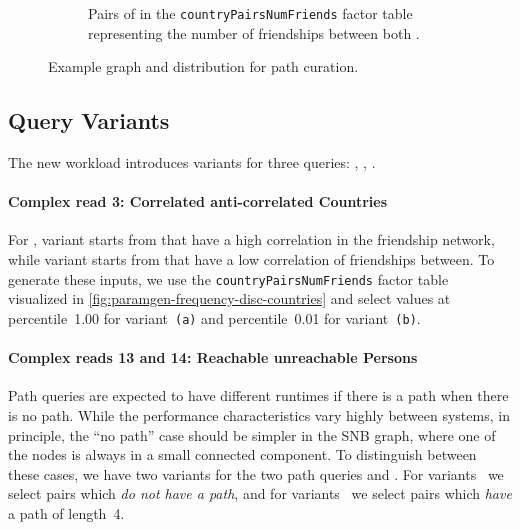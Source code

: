 \begin{figure}[htb]
\begin{subfigure}{0.58\textwidth}
        \vspace{-3ex}
        \caption{
            Pairs of \Countries in the \texttt{countryPairsNum\-Friends} factor table representing the number of friendships between both \Countries.
        }
        \label{fig:paramgen-frequency-disc-countries}
    \end{subfigure}
    \caption{Example graph and distribution for path curation.}
    \label{y}
    \vspace{-4.5ex}
\end{figure}

\subsection{Query Variants}
\label{sec:interactive-v2-query-variants}

The new workload introduces variants for three queries:
,
,
.

\paragraph{Complex read 3: Correlated \vs anti-correlated Countries}
\label{sec:cr3-variants}
%
For ,
variant \CR[3(a)] starts from \Countries that have a high correlation in the friendship network,
while
variant \CR[3(b)] starts from \Countries that have a low correlation of friendships between.
To generate these inputs, we use the \texttt{countryPairsNumFriends} factor table visualized in \autoref{fig:paramgen-frequency-disc-countries} and select values at percentile~1.00 for variant~\texttt{(a)} and percentile~0.01 for variant~\texttt{(b)}.

\paragraph{Complex reads 13 and 14: Reachable \vs unreachable Persons}
%
Path queries are expected to have different runtimes if there is a path \vs when there is no path.
While the performance characteristics vary highly between systems, in principle, the ``no path'' case should be simpler in the SNB graph, where one of the nodes is always in a small connected component.
To distinguish between these cases, we have two variants for the two path queries  and .
For variants~ we select \Person pairs which \emph{do not have a path},
and for variants~ we select pairs which \emph{have} a path of length~4.

